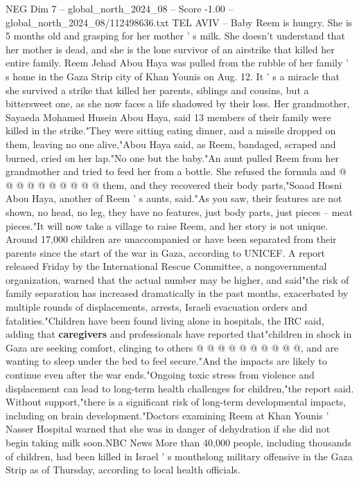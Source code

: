 \begin{textsample}{NEG Dim 7 – global\_north\_2024\_08 – Score -1.00 – global\_north\_2024\_08/112498636.txt}  \label{ex:f7_neg_436}
TEL AVIV -- Baby Reem is hungry.
She is 5 months old and grasping for her mother ' s milk.
She doesn't understand that her mother is dead, and she is the lone survivor of an airstrike that killed her entire family.
Reem Jehad Abou Haya was pulled from the rubble of her family ' s home in the Gaza Strip city of Khan Younis on Aug. 12.
It ' s a miracle that she survived a strike that killed her parents, siblings and cousins, but a bittersweet one, as she now faces a life shadowed by their loss.
Her grandmother, Sayaeda Mohamed Husein Abou Haya, said 13 members of their family were killed in the strike."They were sitting eating dinner, and a missile dropped on them, leaving no one alive,"Abou Haya said, as Reem, bandaged, scraped and burned, cried on her lap."No one but the baby."An aunt pulled Reem from her grandmother and tried to feed her from a bottle.
She refused the formula and @ @ @ @ @ @ @ @ @ @ them, and they recovered their body parts,"Soaad Hosni Abou Haya, another of Reem ' s aunts, said."As you saw, their features are not shown, no head, no leg, they have no features, just body parts, just pieces -- meat pieces."It will now take a village to raise Reem, and her story is not unique.
Around 17,000 children are unaccompanied or have been separated from their parents since the start of the war in Gaza, according to UNICEF.
A report released Friday by the International Rescue Committee, a nongovernmental organization, warned that the actual number may be higher, and said"the risk of family separation has increased dramatically in the past months, exacerbated by multiple rounds of displacements, arrests, Israeli evacuation orders and fatalities."Children have been found living alone in hospitals, the IRC said, adding that \textbf{caregivers} and professionals have reported that"children in shock in Gaza are seeking comfort, clinging to others @ @ @ @ @ @ @ @ @ @, and are wanting to sleep under the bed to feel secure."And the impacts are likely to continue even after the war ends."Ongoing toxic stress from violence and displacement can lead to long-term health challenges for children,"the report said.
Without support,"there is a significant risk of long-term developmental impacts, including on brain development."Doctors examining Reem at Khan Younis ' Nasser Hospital warned that she was in danger of dehydration if she did not begin taking milk soon.NBC News More than 40,000 people, including thousands of children, had been killed in Israel ' s monthslong military offensive in the Gaza Strip as of Thursday, according to local health officials.

\end{textsample}
